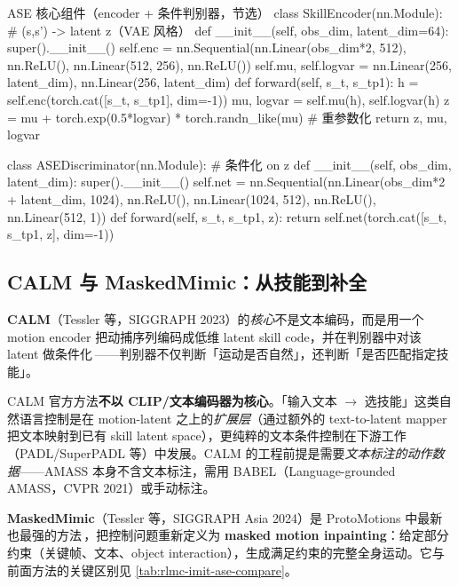 \begin{codebox}[Python]{ASE 核心组件（encoder + 条件判别器，节选）}
class SkillEncoder(nn.Module):          # (s,s') -> latent z（VAE 风格）
    def __init__(self, obs_dim, latent_dim=64):
        super().__init__()
        self.enc = nn.Sequential(nn.Linear(obs_dim*2, 512), nn.ReLU(),
                                 nn.Linear(512, 256), nn.ReLU())
        self.mu, self.logvar = nn.Linear(256, latent_dim), nn.Linear(256, latent_dim)
    def forward(self, s_t, s_tp1):
        h = self.enc(torch.cat([s_t, s_tp1], dim=-1))
        mu, logvar = self.mu(h), self.logvar(h)
        z = mu + torch.exp(0.5*logvar) * torch.randn_like(mu)   # 重参数化
        return z, mu, logvar

class ASEDiscriminator(nn.Module):      # 条件化 on z
    def __init__(self, obs_dim, latent_dim):
        super().__init__()
        self.net = nn.Sequential(nn.Linear(obs_dim*2 + latent_dim, 1024), nn.ReLU(),
                                 nn.Linear(1024, 512), nn.ReLU(), nn.Linear(512, 1))
    def forward(self, s_t, s_tp1, z):
        return self.net(torch.cat([s_t, s_tp1, z], dim=-1))
\end{codebox}

\subsection{CALM 与 MaskedMimic：从技能到补全}
\label{sec:rlmc-imit-ase-calm}

\textbf{CALM}（Tessler 等，SIGGRAPH 2023）的\emph{核心}不是文本编码，而是用一个 motion encoder 把动捕序列编码成低维 latent skill code，并在判别器中对该 latent 做条件化\,\cite{tessler2023calm}——判别器不仅判断「运动是否自然」，还判断「是否匹配指定技能」。

\begin{note}
CALM 官方方法\textbf{不以 CLIP/文本编码器为核心}。「输入文本 $\to$ 选技能」这类自然语言控制是在 motion-latent 之上的\emph{扩展层}（通过额外的 text-to-latent mapper 把文本映射到已有 skill latent space），更纯粹的文本条件控制在下游工作（PADL/SuperPADL 等）中发展。CALM 的工程前提是需要\emph{文本标注的动作数据}——AMASS 本身不含文本标注，需用 BABEL（Language-grounded AMASS，CVPR 2021）或手动标注。
\end{note}

\textbf{MaskedMimic}（Tessler 等，SIGGRAPH Asia 2024）是 ProtoMotions 中最新也最强的方法\,\cite{tessler2024maskedmimic}，把控制问题重新定义为 \textbf{masked motion inpainting}：给定部分约束（关键帧、文本、object interaction），生成满足约束的完整全身运动。它与前面方法的关键区别见 \cref{tab:rlmc-imit-ase-compare}。

